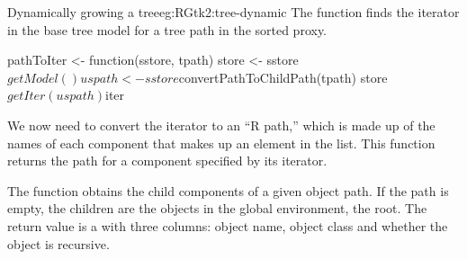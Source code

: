 \begin{example}{Dynamically growing a tree}{eg:RGtk2:tree-dynamic}
The  function finds the iterator in the base tree
model for a tree path in the sorted proxy.
\begin{Schunk}
\begin{Sinput}
 pathToIter <- function(sstore, tpath) {
   store <- sstore$getModel()
   uspath <- sstore$convertPathToChildPath(tpath)
   store$getIter(uspath)$iter
 }
\end{Sinput}
\end{Schunk}

We now need to convert the iterator to an ``R path,'' which is made up
of the names of each component that makes up an element in the
list. This function returns the path for a component specified by its
iterator.
\begin{Schunk}
\end{Schunk}

The  function obtains the child components of a
given \R\/ object path. If the path is empty, the children are the
objects in the global environment, the root. The return value is a
 with three columns: object name, object class and
whether the object is recursive.
\begin{Schunk}
\end{Schunk}


\end{example}
